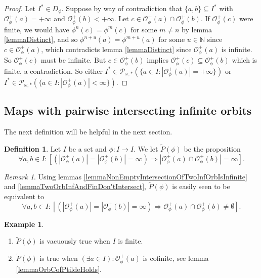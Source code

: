 \documentclass[a4paper,11pt]{article}
\theoremstyle{plain}
\theoremstyle{definition}
\newtheorem{definition}{Definition}[section]
\newtheorem{example}{Example}[section]   %
\theoremstyle{remark}
\newtheorem{remark}{Remark}[section]
\begin{document}
\begin{proof}
Let $I^* \in D_\phi$. Suppose by way of contradiction that $\{a,b\} \subseteq I^*$ with $\mathcal{O}^{+}_\phi(a) = +\infty$ and $\mathcal{O}^{+}_\phi(b) < +\infty$. Let $c \in \mathcal{O}^{+}_\phi(a) \cap \mathcal{O}^{+}_\phi(b)$. If $\mathcal{O}^{+}_\phi(c)$ were finite, we would have $\phi^n(c) = \phi^m(c)$ for some $m \neq n$ by lemma \ref{lemmaDistinct}, and so $\phi^{n+u}(a) = \phi^{m+u}(a)$ for some $u \in \mathbb{N}$ since $c \in \mathcal{O}^{+}_\phi(a)$, which contradicts lemma \ref{lemmaDistinct} since $\mathcal{O}^{+}_\phi(a)$ is infinite. So $\mathcal{O}^{+}_\phi(c)$ must be infinite. But $c \in \mathcal{O}^{+}_\phi(b)$ implies $\mathcal{O}^{+}_\phi(c) \subseteq \mathcal{O}^{+}_\phi(b)$ which is finite, a contradiction. So either $I^* \in \mathcal{P}_{\omega,*}(\{a \in I : |\mathcal{O}^{+}_\phi(a)|=+\infty\})$ or $I^* \in \mathcal{P}_{\omega,*}(\{a \in I : |\mathcal{O}^{+}_\phi(a)| < \infty\})$.
\end{proof}


\subsection{Maps with pairwise intersecting infinite orbits}


The next definition will be helpful in the next section.

\begin{definition}
Let $I$ be a set and $\phi : I \to I$. We let $\widetilde{P}(\phi)$ be the proposition
\[ \forall a,b \in I : \left[ (|\mathcal{O}^{+}_\phi(a)|=|\mathcal{O}^{+}_\phi(b)|=\infty) \Rightarrow | \mathcal{O}^{+}_\phi(a) \cap \mathcal{O}^{+}_\phi(b) | = \infty \right]. \]
\end{definition}

\begin{remark}
\label{remarkPtilde}
Using lemmas \ref{lemmaNonEmptyIntersectionOfTwoInfOrbIsInfinite} and \ref{lemmaTwoOrbInfAndFinDon'tIntersect}, $\widetilde{P}(\phi)$ is easily seen to be equivalent to
\[ \forall a,b \in I : \left[ (|\mathcal{O}^{+}_\phi(a)|=|\mathcal{O}^{+}_\phi(b)|=\infty) \Rightarrow \mathcal{O}^{+}_\phi(a) \cap \mathcal{O}^{+}_\phi(b) \neq \emptyset \right]. \]
\end{remark}

\begin{example}
\begin{enumerate}
\item $\widetilde{P}(\phi)$ is vacuously true when $I$ is finite.
\item $\widetilde{P}(\phi)$ is true when $(\exists a \in I) : \mathcal{O}^{+}_\phi(a)$ is cofinite, see lemma \ref{lemmaOrbCofPtildeHolds}.
\end{enumerate}
\end{example}
\end{document}
